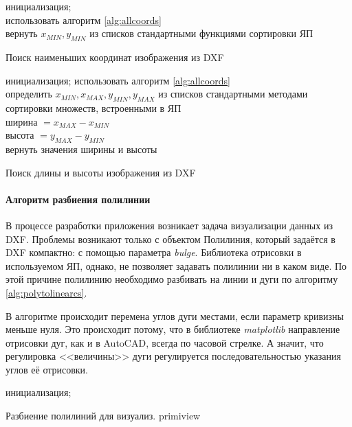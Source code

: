 \begin{algorithm}[H]
	\SetAlgoLined
	инициализация;\\
	использовать алгоритм \ref{alg:allcoords}\\
	вернуть $x_{MIN}, y_{MIN}$ из списков стандартными функциями сортировки ЯП
	\caption{Поиск наименьших координат изображения из DXF}
	\label{alg:extremums}
\end{algorithm}

\begin{algorithm}[H]
	\SetAlgoLined
	инициализация;
	использовать алгоритм \ref{alg:allcoords}\\
	определить $x_{MIN}, x_{MAX}, y_{MIN}, y_{MAX}$ из списков стандартными методами сортировки множеств, встроенными в ЯП\\
	ширина $=x_{MAX}-x_{MIN}$\\
	высота $=y_{MAX}-y_{MIN}$\\
	вернуть значения ширины и высоты
	\caption{Поиск длины и высоты изображения из DXF}
	\label{alg:dimes}
\end{algorithm}

\paragraph{Алгоритм разбиения полилинии}
В процессе разработки приложения возникает задача визуализации данных из DXF. Проблемы возникают только с объектом Полилиния, который задаётся в DXF компактно: с помощью параметра \textit{bulge}. Библиотека отрисовки в используемом ЯП, однако, не позволяет задавать полилинии ни в каком виде. По этой причине полилинию необходимо разбивать на линии и дуги по алгоритму \ref{alg:polytolinearcs}.

В алгоритме происходит перемена углов дуги местами, если параметр кривизны меньше нуля. Это происходит потому, что в библиотеке \textit{matplotlib} направление отрисовки дуг, как и в AutoCAD, всегда по часовой стрелке. А значит, что регулировка <<величины>> дуги регулируется последовательностью указания углов её отрисовки.

\begin{algorithm}[H]
	\SetAlgoLined
	инициализация;
	\caption{Разбиение полилиний для визуализ. primiview}
	\label{alg:polytolinearcs}
\end{algorithm}

